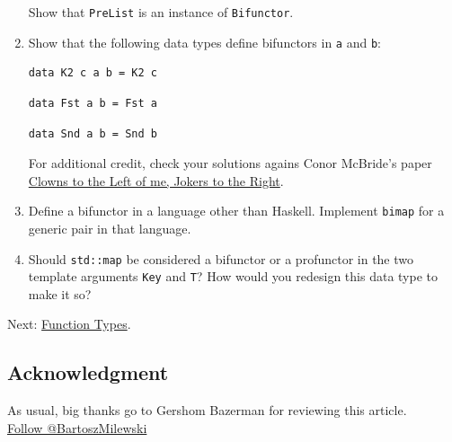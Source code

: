 \begin{enumerate}
  Show that \texttt{PreList} is an instance of \texttt{Bifunctor}.
\item
  Show that the following data types define bifunctors in \texttt{a} and
  \texttt{b}:

\begin{verbatim}
data K2 c a b = K2 c
\end{verbatim}

\begin{verbatim}
data Fst a b = Fst a
\end{verbatim}

\begin{verbatim}
data Snd a b = Snd b
\end{verbatim}

  For additional credit, check your solutions agains Conor McBride's
  paper \href{http://strictlypositive.org/CJ.pdf}{Clowns to the Left of
  me, Jokers to the Right}.
\item
  Define a bifunctor in a language other than Haskell. Implement
  \texttt{bimap} for a generic pair in that language.
\item
  Should \texttt{std::map} be considered a bifunctor or a profunctor in
  the two template arguments \texttt{Key} and \texttt{T}? How would you
  redesign this data type to make it so?
\end{enumerate}

Next:
\href{https://bartoszmilewski.com/2015/03/13/function-types/}{Function
Types}.

\subsection{Acknowledgment}\label{acknowledgment}

As usual, big thanks go to Gershom Bazerman for reviewing this
article.\\
\href{https://twitter.com/BartoszMilewski}{Follow @BartoszMilewski}
